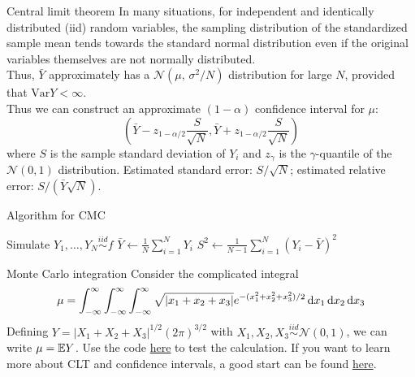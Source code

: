\documentclass{beamer}
\begin{document}
\begin{frame}{Central limit theorem}
    In many situations, for independent and identically distributed (iid) random variables, the sampling distribution of the standardized sample mean tends towards the standard normal distribution even if the original variables themselves are not normally distributed.
    \\[10pt]
    Thus, $\bar{Y}$ approximately has a $\mathcal{N}(\mu,\,\sigma^{2}/N)$ distribution for large $N$, provided that $\mathrm{Var} Y < \infty$.
    \\[10pt]
    Thus we can construct an approximate $(1-\alpha)$ confidence interval for $\mu$:
    \[
        \left(\bar{Y}-z_{1-\alpha/2}\frac{S}{\sqrt{N}}, \bar{Y}+z_{1-\alpha/2}\frac{S}{\sqrt{N}}\right)    
    \]
    where $S$ is the sample standard deviation of ${Y_i}$ and $z_{\gamma}$ is the $\gamma$-quantile of the $\mathcal{N}(0,1)$ distribution. Estimated standard error: $S/\sqrt{N}$; estimated relative error: $S/(\bar{Y}\sqrt{N})$.
\end{frame}

\begin{frame}[fragile]{Algorithm for CMC}
    \begin{algorithm}[H]
        \DontPrintSemicolon
          
        Simulate $Y_1,\ldots,Y_N \stackrel{iid}{\sim}f$\;
        $\bar{Y}\leftarrow \frac{1}{N}\sum_{i=1}^N Y_i$\;
        $S^2 \leftarrow \frac{1}{N-1}\sum_{i=1}^N (Y_i-\bar{Y})^2$\;
        \;
        \caption{CMC for iid}
        \end{algorithm}
\end{frame}

\begin{frame}{Monte Carlo integration}
    Consider the complicated integral
    \[
        \mu = \int_{-\infty}^{\infty}  \int_{-\infty}^{\infty} \int_{-\infty}^{\infty} \sqrt{|x_1+x_2+x_3|} e^{-(x_1^2+x_2^2+x_3^2)/2} \mathop{}\!\mathrm{d} x_1 \mathop{}\!\mathrm{d} x_2 \mathop{}\!\mathrm{d} x_3  
    \]
    Defining $Y=|X_1+X_2+X_3|^{1/2}(2\pi)^{3/2}$ with $X_1,X_2,X_3 \stackrel{iid}{\sim} \mathcal{N}(0,1)$, we can write $\mu=\mathbb{E} Y$.
    Use the code \href{https://biocomputing-teaching.github.io/Data-Science-with-Python/code/UNIT3-MC-Methods.html}{here} to test the calculation. If you want to learn more about CLT and confidence intervals, a good start can be found \href{https://online.stat.psu.edu/stat506/lesson/1/1.4}{here}.
\end{frame}
\end{document}
